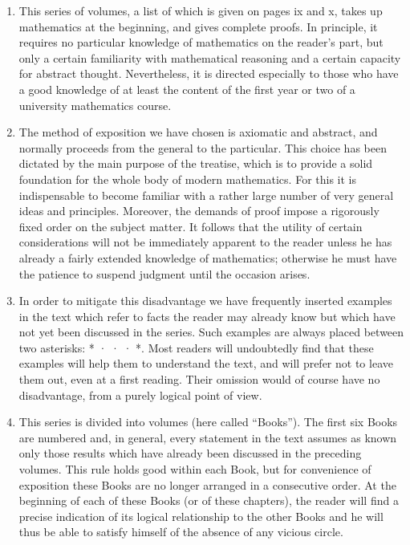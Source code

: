 
\begin{enumerate}
\def\labelenumi{\arabic{enumi}.}
\item
  This series of volumes, a list of which is given on pages ix and x, takes up mathematics at the beginning, and gives complete proofs. In principle, it requires no particular knowledge of mathematics on the reader's part, but only a certain familiarity with mathematical reasoning and a certain capacity for abstract thought. Nevertheless, it is directed especially to those who have a good knowledge of at least the content of the first year or two of a university mathematics course.
\item
  The method of exposition we have chosen is axiomatic and abstract, and normally proceeds from the general to the particular. This choice has been dictated by the main purpose of the treatise, which is to provide a solid foundation for the whole body of modern mathematics. For this it is indispensable to become familiar with a rather large number of very general ideas and principles. Moreover, the demands of proof impose a rigorously fixed order on the subject matter. It follows that the utility of certain considerations will not be immediately apparent to the reader unless he has already a fairly extended knowledge of mathematics; otherwise he must have the patience to suspend judgment until the occasion arises.
\item
  In order to mitigate this disadvantage we have frequently inserted examples in the text which refer to facts the reader may already know but which have not yet been discussed in the series. Such examples are always placed between two asterisks: * · · · *. Most readers will undoubtedly find that these examples will help them to understand the text, and will prefer not to leave them out, even at a first reading. Their omission would of course have no disadvantage, from a purely logical point of view.
\item
  This series is divided into volumes (here called ``Books''). The first six Books are numbered and, in general, every statement in the text assumes as known only those results which have already been discussed in the preceding volumes. This rule holds good within each Book, but for convenience of exposition these Books are no longer arranged in a consecutive order. At the beginning of each of these Books (or of these chapters), the reader will find a precise indication of its logical relationship to the other Books and he will thus be able to satisfy himself of the absence of any vicious circle.
\end{enumerate}

